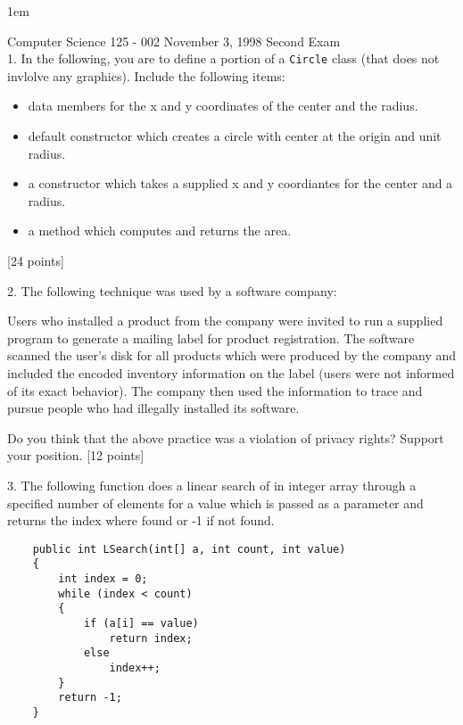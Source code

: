 \pagestyle{empty}
\parskip 1em
\topmargin 1pt \headheight 1pt \headsep 2pt \footskip 1pt 
\oddsidemargin -10pt \evensidemargin -10pt \parindent 0pt



Computer Science 125 - 002 \hspace*{1in} November 3, 1998 \hspace*{1in} Second Exam\\

1. In the following, you are to define a portion of a {\tt Circle}
class (that does not invlolve any graphics).
Include the following items:
\begin{itemize}
\item data members for the x and y coordinates
of the center and the radius.
\item default constructor which creates a circle with
center at the origin and unit radius.
\item a constructor which takes a supplied x and y coordiantes
for the center and a radius.
\item a method which computes and returns the area.
\end{itemize}
[24 points]





2. The following technique was used by a software
company:

Users who installed a product from the company
were invited to run a supplied program to
generate a mailing label 
for product registration.  The
software scanned the user's disk for all products which
were produced by the company 
and included the encoded inventory information
on the label (users were not informed of its exact behavior).  
The company then used the
information to trace and pursue people who 
had illegally installed its software.

Do you think that the above practice was a violation of
privacy rights?  Support your position.  [12 points]

3. The following function does a linear search of
in integer array through a specified number of
elements for a value which is passed as a parameter and
returns the index where found or -1 if not found.


\begin{verbatim}
    public int LSearch(int[] a, int count, int value)
    {
        int index = 0;
        while (index < count)
        {
            if (a[i] == value)
                return index;
            else
                index++;
        }
        return -1;
    }
\end{verbatim}

